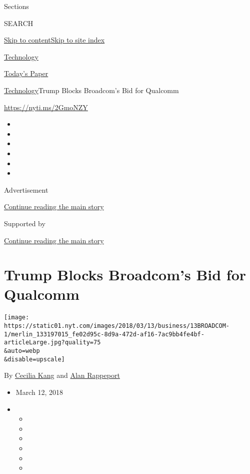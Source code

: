 Sections

SEARCH

\protect\hyperlink{site-content}{Skip to
content}\protect\hyperlink{site-index}{Skip to site index}

\href{https://www.nytimes.com/section/technology}{Technology}

\href{https://myaccount.nytimes.com/auth/login?response_type=cookie\&client_id=vi}{}

\href{https://www.nytimes.com/section/todayspaper}{Today's Paper}

\href{/section/technology}{Technology}\textbar{}Trump Blocks Broadcom's
Bid for Qualcomm

\url{https://nyti.ms/2GmoNZY}

\begin{itemize}
\item
\item
\item
\item
\item
\item
\end{itemize}

Advertisement

\protect\hyperlink{after-top}{Continue reading the main story}

Supported by

\protect\hyperlink{after-sponsor}{Continue reading the main story}

\hypertarget{trump-blocks-broadcoms-bid-for-qualcomm}{%
\section{Trump Blocks Broadcom's Bid for
Qualcomm}\label{trump-blocks-broadcoms-bid-for-qualcomm}}

\texttt{[image: https://static01.nyt.com/images/2018/03/13/business/13BROADCOM-1/merlin\_133197015\_fe02d95c-8d9a-472d-af16-7ac9bb4fe4bf-articleLarge.jpg?quality=75\\\&auto=webp\\\&disable=upscale]}

By \href{https://www.nytimes.com/by/cecilia-kang}{Cecilia Kang} and
\href{https://www.nytimes.com/by/alan-rappeport}{Alan Rappeport}

\begin{itemize}
\item
  March 12, 2018
\item
  \begin{itemize}
  \item
  \item
  \item
  \item
  \item
  \item
  \end{itemize}
\end{itemize}

